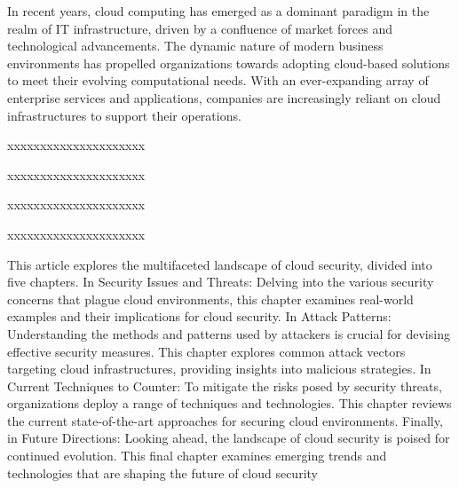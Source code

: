 In recent years, cloud computing has emerged as a dominant paradigm in the realm of IT infrastructure, driven by a confluence of market forces and technological advancements. The dynamic nature of modern business environments has propelled organizations towards adopting cloud-based solutions to meet their evolving computational needs. With an ever-expanding array of enterprise services and applications, companies are increasingly reliant on cloud infrastructures to support their operations.






xxxxxxxxxxxxxxxxxxxxx


xxxxxxxxxxxxxxxxxxxxx


xxxxxxxxxxxxxxxxxxxxx


xxxxxxxxxxxxxxxxxxxxx
 


This article explores the multifaceted landscape of cloud security, divided into five chapters. In Security Issues and Threats: Delving into the various security concerns that plague cloud environments, this chapter examines real-world examples and their implications for cloud security. In Attack Patterns: Understanding the methods and patterns used by attackers is crucial for devising effective security measures. This chapter explores common attack vectors targeting cloud infrastructures, providing insights into malicious strategies. In Current Techniques to Counter: To mitigate the risks posed by security threats, organizations deploy a range of techniques and technologies. This chapter reviews the current state-of-the-art approaches for securing cloud environments. Finally, in Future Directions: Looking ahead, the landscape of cloud security is poised for continued evolution. This final chapter examines emerging trends and technologies that are shaping the future of cloud security